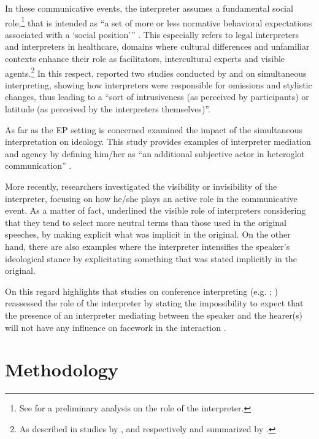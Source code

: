 \documentclass[output=paper]{langscibook}
\begin{document}
In these communicative events, the interpreter assumes a fundamental social role,\footnote{See \citet{Anderson2002} for a preliminary analysis on the role of the interpreter.} that is intended as “a set of more or less normative behavioral expectations associated with a ‘social position’” \citep[147]{Poechhacker2004}. This especially refers to legal interpreters and interpreters in healthcare, domains where cultural differences and unfamiliar contexts enhance their role as facilitators, intercultural experts and visible agents.\footnote{As described in studies by \citet{LasterTaylor1994}, \citet{Barsky1996} and \citet{Angelelli2001} respectively and summarized by \citet[147--149]{Poechhacker2004}.} In this respect, \citet[149]{Poechhacker2004} reported two studies conducted by \citet{Morris1989} and \citet{Shlesinger1991} on simultaneous interpreting, showing how interpreters were responsible for omissions and stylistic changes, thus leading to a “sort of intrusiveness (as perceived by participants) or latitude (as perceived by the interpreters themselves)”.

As far as the EP setting is concerned \citet{Beaton2007} examined the impact of the simultaneous interpretation on ideology. This study provides examples of interpreter mediation and agency by defining him/her as “an additional subjective actor in heteroglot communication” \citep[271]{Beaton2007}.

More recently, researchers investigated the visibility or invisibility of the interpreter, focusing on how he/she plays an active role in the communicative event. As a matter of fact, \citet{BeatonThome2013} underlined the visible role of interpreters considering that they tend to select more neutral terms than those used in the original speeches, by making explicit what was implicit in the original. On the other hand, there are also examples where the interpreter intensifies the speaker’s ideological stance by explicitating something that was stated implicitly in the original.

On this regard \citet[128]{Bartlomiejczyk2016} highlights that studies on conference interpreting (e.g. \citealt{Diriker2004}; \citealt{Monacelli2009}) reassessed the role of the interpreter by stating the impossibility to
expect that the presence of an interpreter mediating between the speaker and the hearer(s) will not have any influence on facework in the interaction \citep[128]{Bartlomiejczyk2016}.



\section{Methodology}\label{sec:mori:3}
\end{document}
